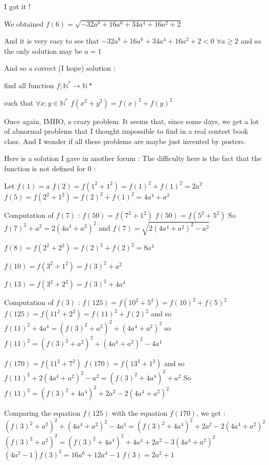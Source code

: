 \begin{solution}
	I got it !

We obtained $ f(6) = \sqrt { - 32a^8 + 16a^6 + 34a^4 + 16a^2 + 2}$

And it is very easy to see that  $ - 32a^8 + 16a^6 + 34a^4 + 16a^2 + 2 < 0$ $ \forall a\ge 2$ and so the only solution may be $ a = 1$

And so a correct (I hope) solution :
\begin{tcolorbox}find all function $ f;\mathbb{N}^* \to \mathbb{N}*$

such that $ \forall x;y \in \mathbb{N}^*$
$ f(x^2 + y^2) = f(x)^2 + f(y)^2$\end{tcolorbox}
Once again, IMHO, a crazy problem. It seems that, since some days, we get a lot of abnormal problems that I thought impossible to find in a real contest \/ book \/ class. And I wonder if all these problems are maybe just invented by posters.

Here is a solution I gave in another forum :
The difficulty here is the fact that the function is not defined for $ 0$ :

Let $ f(1) = a$
$ f(2) = f(1^2 + 1^2) = f(1)^2 + f(1)^2 = 2a^2$
$ f(5) = f(2^2 + 1^2) = f(2)^2 + f(1)^2 = 4a^4 + a^2$

Computation of $ f(7)$ :
$ f(50) = f(7^2 + 1^2)$
$ f(50) = f(5^2 + 5^2)$
So $ f(7)^2 + a^2 = 2(4a^4 + a^2)^2$
and $ f(7) = \sqrt {2(4a^4 + a^2)^2 - a^2}$

$ f(8) = f(2^2 + 2^2) = f(2)^2 + f(2)^2 = 8a^4$

$ f(10) = f(3^2 + 1^2) = f(3)^2 + a^2$

$ f(13) = f(3^2 + 2^2) = f(3)^2 + 4a^4$

Computation of $ f(3)$ :
$ f(125) = f(10^2 + 5^2) = f(10)^2 + f(5)^2$
$ f(125) = f(11^2 + 2^2) = f(11)^2 + f(2)^2$
and so $ f(11)^2 + 4a^4 = (f(3)^2 + a^2)^2 + (4a^4 + a^2)^2$
so $ f(11)^2 = (f(3)^2 + a^2)^2 + (4a^4 + a^2)^2 - 4a^4$


$ f(170) = f(11^2 + 7^2)$
$ f(170) = f(13^2 + 1^2)$
and so $ f(11)^2 + 2(4a^4 + a^2)^2 - a^2 = (f(3)^2 + 4a^4)^2 + a^2$
So $ f(11)^2 = (f(3)^2 + 4a^4)^2 + 2a^2 - 2(4a^4 + a^2)^2$

Comparing the equation  $ f(125)$ with the equation $ f(170)$, we get :
$ (f(3)^2 + a^2)^2 + (4a^4 + a^2)^2 - 4a^4 = (f(3)^2 + 4a^4)^2 + 2a^2 - 2(4a^4 + a^2)^2$
$ (f(3)^2 + a^2)^2 = (f(3)^2 + 4a^4)^2 + 4a^4 + 2a^2 - 3(4a^4 + a^2)^2$
$ (4a^2 - 1)f(3)^2 = 16a^6 + 12a^4 - 1$
$ f(3) = 2a^2 + 1$


\end{solution}
